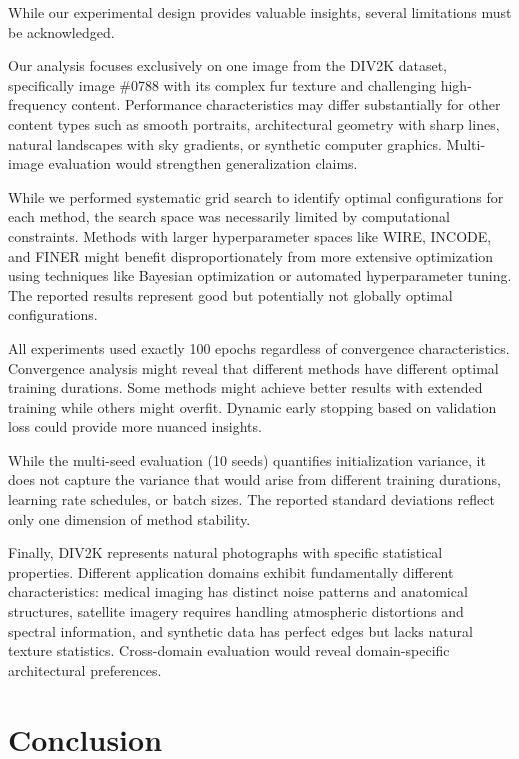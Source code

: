 \documentclass[a4paper,oneside,10pt,ngerman,english]{scrartcl}
\begin{document}
While our experimental design provides valuable insights, several limitations must be acknowledged.

Our analysis focuses exclusively on one image from the DIV2K dataset, specifically image \#0788 with its complex fur texture and challenging high-frequency content. Performance characteristics may differ substantially for other content types such as smooth portraits, architectural geometry with sharp lines, natural landscapes with sky gradients, or synthetic computer graphics. Multi-image evaluation would strengthen generalization claims.

While we performed systematic grid search to identify optimal configurations for each method, the search space was necessarily limited by computational constraints. Methods with larger hyperparameter spaces like WIRE, INCODE, and FINER might benefit disproportionately from more extensive optimization using techniques like Bayesian optimization or automated hyperparameter tuning. The reported results represent good but potentially not globally optimal configurations.

All experiments used exactly 100 epochs regardless of convergence characteristics. Convergence analysis might reveal that different methods have different optimal training durations. Some methods might achieve better results with extended training while others might overfit. Dynamic early stopping based on validation loss could provide more nuanced insights.

While the multi-seed evaluation (10 seeds) quantifies initialization variance, it does not capture the variance that would arise from different training durations, learning rate schedules, or batch sizes. The reported standard deviations reflect only one dimension of method stability.

Finally, DIV2K represents natural photographs with specific statistical properties. Different application domains exhibit fundamentally different characteristics: medical imaging has distinct noise patterns and anatomical structures, satellite imagery requires handling atmospheric distortions and spectral information, and synthetic data has perfect edges but lacks natural texture statistics. Cross-domain evaluation would reveal domain-specific architectural preferences.
\cleardoubleoddpage
\section{Conclusion}
\label{sec:conclusion}
\end{document}
